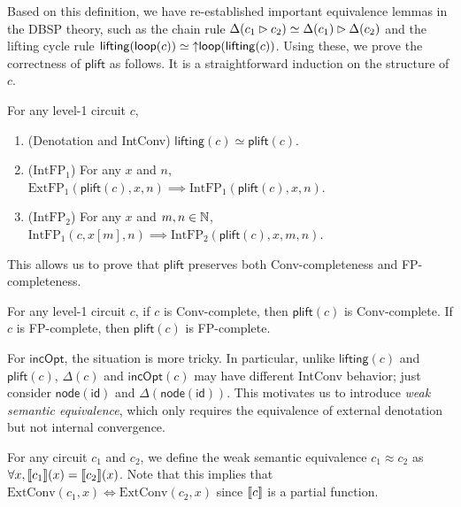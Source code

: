 Based on this definition, we have re-established important equivalence lemmas in the DBSP theory, such as the chain rule $\Delta(c_1 \mathbin{\vartriangleright} c_2) \simeq \Delta(c_1) \mathbin{\vartriangleright} \Delta(c_2)$ and the lifting cycle rule $\mathsf{lifting}(\mathsf{loop}(c)) \simeq \mathsf{{\uparrow}loop}(\mathsf{lifting}(c))$. Using these, we prove the correctness of $\mathsf{plift}$ as follows. It is a straightforward induction on the structure of $c$.

\begin{theorem}\label{thm:pushLifting-correctness}
    For any level-1 circuit $c$,
    \begin{enumerate}
        \item (Denotation and IntConv) $\mathsf{lifting}(c) \simeq \mathsf{plift}(c)$.
        \item ($\text{IntFP}_1$) For any $x$ and $n$, $\text{ExtFP}_1(\mathsf{plift}(c), x, n) \implies \text{IntFP}_1(\mathsf{plift}(c), x, n)$.
        \item ($\text{IntFP}_2$) For any $x$ and $m,n \in \mathbb{N}$, $\text{IntFP}_1(c, x[m], n) \implies \text{IntFP}_2(\mathsf{plift}(c), x, m, n)$.
    \end{enumerate}
\end{theorem}

This allows us to prove that $\mathsf{plift}$ preserves both Conv-completeness and FP-completeness.
\begin{theorem}\label{thm:pushLifting-convcomplete}
    For any level-1 circuit $c$, if $c$ is Conv-complete, then $\mathsf{plift}(c)$ is Conv-complete. If $c$ is FP-complete, then $\mathsf{plift}(c)$ is FP-complete.
\end{theorem}

For $\mathsf{incOpt}$, the situation is more tricky. In particular, unlike $\mathsf{lifting}(c)$ and $\mathsf{plift}(c)$, $\Delta(c)$ and $\mathsf{incOpt}(c)$ may have different IntConv behavior; just consider $\mathsf{node}(\mathsf{id})$ and $\Delta(\mathsf{node}(\mathsf{id}))$. This motivates us to introduce \emph{weak semantic equivalence}, which only requires the equivalence of external denotation but not internal convergence.
\begin{definition}
    For any circuit $c_1$ and $c_2$, we define the weak semantic equivalence $c_1 \approx c_2$ as $\forall x, \llbracket c_1 \rrbracket(x) = \llbracket c_2 \rrbracket(x)$. Note that this implies that $\text{ExtConv}(c_1, x) \iff \text{ExtConv}(c_2, x)$ since $\llbracket c \rrbracket$ is a partial function.
\end{definition}

